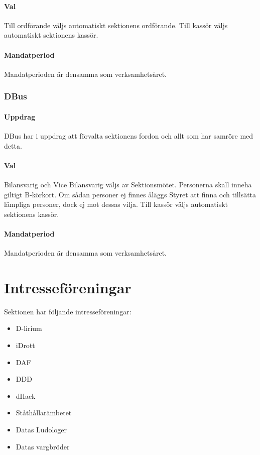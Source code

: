 \documentclass[a4paper, 10pt]{article}
\begin{document}
\paragraph{Val\\}
Till ordförande väljs automatiskt sektionens ordförande. Till kassör väljs automatiskt sektionens kassör.
\paragraph{Mandatperiod\\}
Mandatperioden är densamma som verksamhetsåret.
\subsubsection{DBus}
\paragraph{Uppdrag\\}
DBus har i uppdrag att förvalta sektionens fordon och allt som har samröre med detta.
\paragraph{Val\\}
Bilansvarig och Vice Bilansvarig väljs av Sektionsmötet. Personerna skall inneha giltigt B-körkort. Om sådan personer ej finnes åläggs Styret att finna och tillsätta lämpliga personer, dock ej mot dessas vilja. Till kassör väljs automatiskt sektionens kassör.
\paragraph{Mandatperiod\\}
Mandatperioden är densamma som verksamhetsåret.
\newpage
\section{Intresseföreningar}
Sektionen har följande intresseföreningar:
\begin{itemize}
  \item D-lirium 
  \item iDrott 
  \item DAF 
  \item DDD
  \item dHack
  \item Ståthållarämbetet
  \item Datas Ludologer 
  \item Datas vargbröder
\end{itemize}
\end{document}
